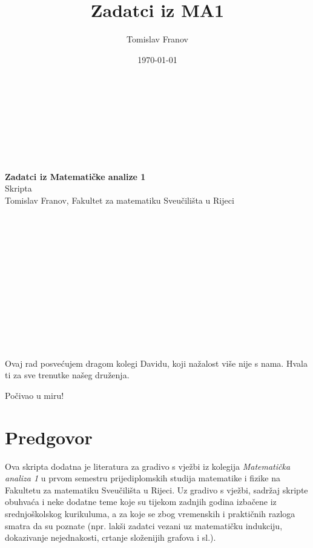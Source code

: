 \documentclass{book}
\title{Zadatci iz MA1}
\author{Tomislav Franov}
\date{\today}
\begin{document}
\begin{titlepage}
\begin{center}
\Huge
\textbf{ }\\ \textbf{ }\\ \textbf{ }\\ \textbf{ }\\ \textbf{ }\\ \textbf{ }\\
\textbf{Zadatci iz Matematičke analize 1}\\
\vspace{0.5 cm}
\huge
Skripta \textbf{ }\\
\vspace{0.5 cm}
\Large
Tomislav Franov, Fakultet za matematiku Sveučilišta u Rijeci
\end{center}
\end{titlepage}
\Large
\newpage
\thispagestyle{empty}
\begin{center}
\textbf{ }\\ \textbf{ }\\ \textbf{ }\\ \textbf{ }\\ \textbf{ }\\ \textbf{ }\\
\textbf{ }\\ \textbf{ }\\ \textbf{ }\\ \textbf{ }\\
\textbf{ }\\ \textbf{ }\\
Ovaj rad posvećujem dragom kolegi Davidu, koji nažalost više nije s nama. Hvala ti za sve trenutke našeg druženja.

Počivao u miru!\\
\end{center}
\large
\vspace{0.5 cm}
\tableofcontents
\thispagestyle{empty}
\chapter*{Predgovor}

Ova skripta dodatna je literatura za gradivo s vježbi iz kolegija \textit{Matematička analiza 1} u prvom semestru prijediplomskih studija matematike i fizike na Fakultetu za matematiku Sveučilišta u Rijeci. Uz gradivo s vježbi, sadržaj skripte obuhvaća i neke dodatne teme koje su tijekom zadnjih godina izbačene iz srednjoškolskog kurikuluma, a za koje se zbog vremenskih i praktičnih razloga smatra da su poznate (npr. lakši zadatci vezani uz matematičku indukciju, dokazivanje nejednakosti, crtanje složenijih grafova i sl.).
\end{document}
